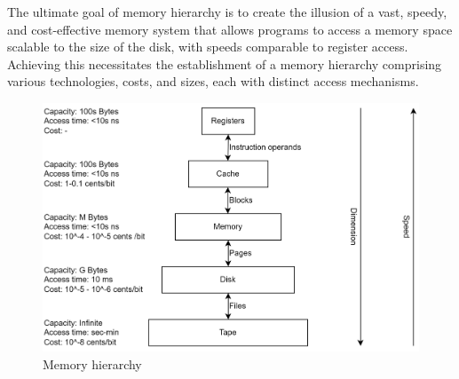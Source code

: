 The ultimate goal of memory hierarchy is to create the illusion of a vast, speedy, and cost-effective memory system that allows programs to access a memory space scalable to the size of the disk, with speeds comparable to register access.
Achieving this necessitates the establishment of a memory hierarchy comprising various technologies, costs, and sizes, each with distinct access mechanisms.
\begin{figure}[H]
    \centering
    \includegraphics[width=0.75\linewidth]{images/hierarchy.png}
    \caption{Memory hierarchy}
\end{figure}